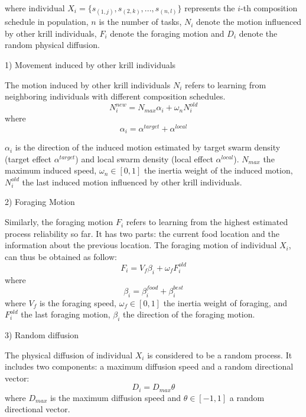 \documentclass[journal]{IEEEtran}
\begin{document}
where individual $X_i = \{s_{(1,j)}, s_{(2,k)}, . . . , s_{(n,l)}\}$ represents the $i$-th composition schedule in population, $n$ is the number of tasks, $N_i$ denote the motion influenced by other krill individuals, $F_i$ denote the foraging motion and $D_i$ denote the random physical diffusion.

1) Movement induced by other krill individuals

The motion induced by other krill individuals $N_i$ refers to learning from neighboring individuals with different composition schedules.
\begin{equation}
N^{new}_i = N_{max}\alpha_i + \omega_n N^{old}_i
\end{equation}
where
\begin{equation}
\alpha_i = \alpha^{target} + \alpha^{local}
\end{equation}

$\alpha_i$ is the direction of the induced motion estimated by target swarm density (target effect $\alpha^{target}$) and local swarm density (local effect $\alpha^{local}$). $N_{max}$ the maximum induced speed, $\omega_n \in [0, 1]$ the inertia weight of the induced motion, $N^{old}_{i}$ the last induced motion influenced by other krill individuals.

2) Foraging Motion

Similarly, the foraging motion $F_i$ refers to learning from the highest estimated process reliability so far. 
It has two parts: the current food location and the information about the previous location. 
The foraging motion of individual $X_i$, can thus be obtained as follow:
\begin{equation}
F_i = V_f\beta_i + \omega_f F^{old}_i
\end{equation}
where
\begin{equation}
\beta_i = \beta_i^{food}+\beta_i^{best}
\end{equation}
where $V_f$ is the foraging speed, $\omega_f \in [0, 1]$ the inertia weight of foraging, and $F^{old}_i$ the last foraging motion, $\beta_i$ the direction of the foraging motion.

3) Random diffusion

The physical diffusion of individual $X_i$ is considered to be a random process. It includes two components: a maximum diffusion speed and a random directional vector:
\begin{equation}
D_i = D_{max}\theta
\end{equation}
where $D_{max}$ is the maximum diffusion speed and $\theta \in [-1, 1]$ a random directional vector.
\end{document}
